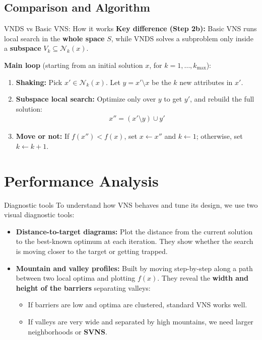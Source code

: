 \documentclass{beamer}
\begin{document}
\subsection{Comparison and Algorithm}
\begin{frame}{VNDS vs Basic VNS: How it works}
\textbf{Key difference (Step 2b):} Basic VNS runs local search in the \textbf{whole space} $S$, while VNDS solves a subproblem only inside a \textbf{subspace} $V_k \subseteq \mathcal{N}_k(x)$.

\vspace{0.25cm}
\textbf{Main loop} (starting from an initial solution $x$, for $k = 1, \dots, k_{\max}$):
\begin{enumerate}
\item \textbf{Shaking:} Pick $x' \in \mathcal{N}_k(x)$. Let $y = x' \setminus x$ be the $k$ new attributes in $x'$.
\item \textbf{Subspace local search:} Optimize only over $y$ to get $y'$, and rebuild the full solution:
\begin{gather*}
    x'' = (x' \setminus y) \cup y'
\end{gather*}
\item \textbf{Move or not:} If $f(x'') < f(x)$, set $x \leftarrow x''$ and $k \leftarrow 1$; otherwise, set $k \leftarrow k + 1$.
\end{enumerate}
\end{frame}



\section{Performance Analysis}

\begin{frame}{Diagnostic tools}
\quad To understand how VNS behaves and tune its design, we use two visual diagnostic tools:

\vspace{0.25cm}
\begin{itemize}
\item \textbf{Distance-to-target diagrams:} Plot the distance from the current solution to the best-known optimum at each iteration. They show whether the search is moving closer to the target or getting trapped.
\vspace{0.25cm}
\item \textbf{Mountain and valley profiles:} Built by moving step-by-step along a path between two local optima and plotting $f(x)$. They reveal the \textbf{width and height of the barriers} separating valleys:
    \begin{itemize}
    \item If barriers are low and optima are clustered, standard VNS works well.
    \item If valleys are very wide and separated by high mountains, we need larger neighborhoods or \textbf{SVNS}.
    \end{itemize}
\end{itemize}
\end{frame}
\end{document}
